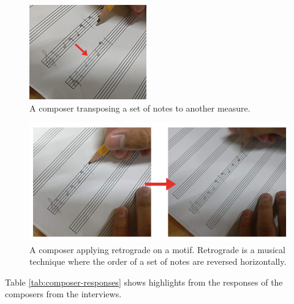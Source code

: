 		\begin{figure}[H]
			\centering
			\includegraphics[scale=1.0]{figures/handwritten-transpose-measure.png}
		    \caption{A composer transposing a set of notes to another measure.}
		    \label{fig:handwritten-transpose-measure}
		\end{figure}

		\begin{figure}[H]
			\centering
			\includegraphics[scale=0.9]{figures/handwritten-retrograde.png}
		    \caption{A composer applying retrograde on a motif. Retrograde is a musical technique where the order of a set of notes are reversed horizontally.}
		    \label{fig:handwritten-retrograde}
		\end{figure}

		Table \ref{tab:composer-responses} shows highlights from the responses of the composers from the interviews.

